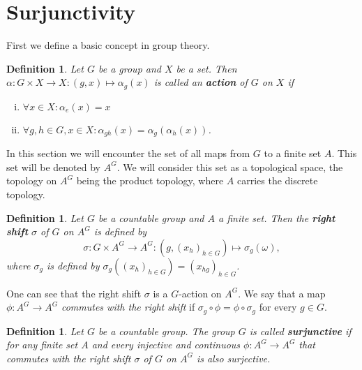 \documentclass[titlepage, a4paper]{article}
\newtheorem{definition}[theorem]{Definition}
\theoremstyle{remark}
\begin{document}
    \section{Surjunctivity}\label{sec:surjunctivity}

    First we define a basic concept in group theory.

    \begin{definition} %
	    Let $G$ be a group and $X$ be a set. Then $\alpha: G \times X \to X: (g,x) \mapsto \alpha_g(x)$ is called an \textbf{action} of $G$ on $X$ if
        \begin{enumerate}[(i)]
            \item $\forall x \in X: \alpha_e(x) = x$
            \item $\forall g,h \in G, x\in X: \alpha_{gh}(x) = \alpha_g(\alpha_h(x))$.
        \end{enumerate}
    \end{definition}

    In this section we will encounter the set of all maps from $G$ to a finite set $A$. This set will be denoted by $A^G$. We will consider this set as a topological space, the topology on $A^G$ being the product topology, where $A$ carries the discrete topology.  
    \begin{definition}
	    Let $G$ be a countable group and $A$ a finite set. Then the \textbf{right shift} $\sigma$ of $G$ on $A^G$ is defined by
        \[
        \sigma: G \times A^G \to A^G: \left(g, (x_{h})_{h \in G} \right) \mapsto \sigma_g(\omega),
        \]
        where $\sigma_g$ is defined by $\sigma_g\left( (x_{h})_{h \in G} \right) = \left( x_{hg} \right)_{h \in G}$. %
    \end{definition}

    One can see that the right shift $\sigma$ is a $G$-action on $A^G$. We say that a map $\phi: A^G \to A^G$ \emph{commutes with the right shift} if $\sigma_g \circ \phi = \phi \circ \sigma_g$ for every $g \in G$.
    
    \begin{definition}
	    Let $G$ be a countable group. The group $G$ is called \textbf{surjunctive} if for any finite set $A$ and every injective and continuous $\phi: A^{G}\to A^{G}$ that commutes with the right shift $\sigma$ of $G$ on $A^G$ is also surjective.
    \end{definition} 

\end{document}
